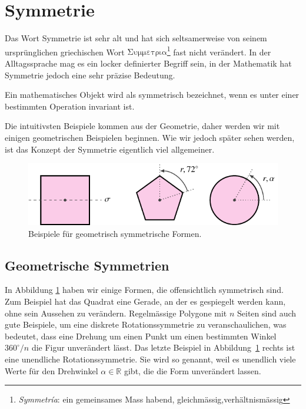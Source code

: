 \section{Symmetrie}
Das Wort Symmetrie ist sehr alt und hat sich seltsamerweise von seinem
ursprünglichen griechischen Wort \(\mathrm{\Sigma\upsilon\mu\mu\varepsilon\tau\rho\iota\alpha}\)\footnote{\emph{Symmetr\'ia}: ein gemeinsames Mass habend, gleichmässig,verhältnismässig} fast nicht verändert.
In der Alltagssprache mag es ein locker definierter Begriff sein, in der Mathematik hat Symmetrie jedoch eine sehr präzise Bedeutung.
\begin{definition}[Symmetrie]
  Ein mathematisches Objekt wird als symmetrisch bezeichnet, wenn es unter einer bestimmten Operation invariant ist.
\end{definition}
Die intuitivsten Beispiele kommen aus der Geometrie, daher werden wir mit einigen geometrischen Beispielen beginnen.
Wie wir jedoch später sehen werden, ist das Konzept der Symmetrie eigentlich viel allgemeiner.

\begin{figure}
  \centering
  \includegraphics{papers/punktgruppen/figures/symmetric-shapes}
  \caption{
    Beispiele für geometrisch symmetrische Formen.
    \label{fig:punktgruppen:geometry-example}
  }
\end{figure}

\subsection{Geometrische Symmetrien}

In Abbildung \ref{fig:punktgruppen:geometry-example} haben wir einige Formen, die offensichtlich symmetrisch sind.
Zum Beispiel hat das Quadrat eine Gerade, an der es gespiegelt werden kann, ohne sein Aussehen zu verändern.
Regelmässige Polygone mit \(n\) Seiten sind auch gute Beispiele, um eine diskrete Rotationssymmetrie zu veranschaulichen, was bedeutet, dass eine Drehung um einen Punkt um einen bestimmten Winkel \(360^\circ/n\) die Figur unverändert lässt.
Das letzte Beispiel in Abbildung~\ref{fig:punktgruppen:geometry-example} rechts ist eine unendliche Rotationssymmetrie. Sie wird so genannt, weil es unendlich viele Werte für den Drehwinkel \(\alpha \in \mathbb{R}\) gibt, die die Form unverändert lassen.

